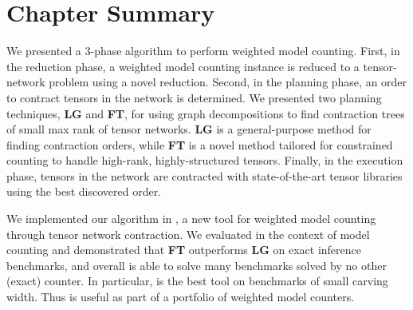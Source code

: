 \section{Chapter Summary} \label{sec:tensors:conclusion}
We presented a 3-phase algorithm to perform weighted model counting. First, in the reduction phase, a weighted model counting instance is reduced to a tensor-network problem using a novel reduction. Second, in the planning phase, an order to contract tensors in the network is determined. We presented two planning techniques, \textbf{LG} and \textbf{FT}, for using graph decompositions to find contraction trees of small max rank of tensor networks. \textbf{LG} is a general-purpose method for finding contraction orders, while \textbf{FT} is a novel method tailored for constrained counting to handle high-rank, highly-structured tensors. Finally, in the execution phase, tensors in the network are contracted with state-of-the-art tensor libraries using the best discovered order.


We implemented our algorithm in , a new tool for weighted model counting through tensor network contraction.
We evaluated  in the context of model counting and demonstrated that \textbf{FT} outperforms \textbf{LG} on exact inference benchmarks, and overall  is able to solve many benchmarks solved by no other (exact) counter.
In particular,  is the best tool on benchmarks of small carving width.
Thus  is useful as part of a portfolio of weighted model counters.





